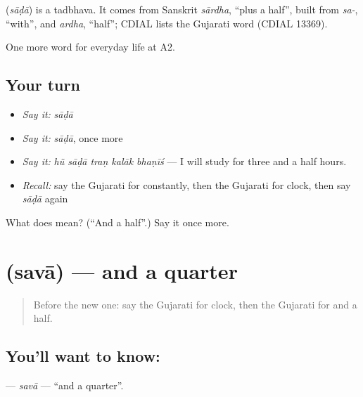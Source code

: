 \begin{cousinweb}
\textbf{} (\emph{sāḍā}) is a tadbhava. It comes from Sanskrit \emph{sārdha}, \textquotedblleft{}plus a half\textquotedblright{}, built from \emph{sa-}, \textquotedblleft{}with\textquotedblright{}, and \emph{ardha}, \textquotedblleft{}half\textquotedblright{}; CDIAL lists the Gujarati word (CDIAL 13369).
\end{cousinweb}

\begin{grammarlens}[title={What you've built}]
One more word for everyday life at A2.
\end{grammarlens}

\subsection*{Your turn}
\begin{itemize}
\raggedright
  \item \emph{Say it:} \emph{sāḍā}
  \item \emph{Say it:} \emph{sāḍā}, once more
  \item \emph{Say it:} \emph{hũ sāḍā traṇ kalāk bhaṇīś} — I will study for three and a half hours.
  \item \emph{Recall:} say the Gujarati for constantly, then the Gujarati for clock, then say \emph{sāḍā} again
\end{itemize}

\begin{tcolorbox}[breakable,colback=teal!4,colframe=teal!35!black,title={Before you move on}]
What does  mean? (\textquotedblleft{}And a half\textquotedblright{}.) Say it once more.
\end{tcolorbox}
\section[\texorpdfstring{\gu{સવા} (savā)}{સવા (savā)}]{ (savā) — and a quarter}

\label{lesson:GU-C176-sava}



\begin{quote}
Before the new one: say the Gujarati for clock, then the Gujarati for and a half.
\end{quote}

\subsection*{You'll want to know: }
\textbf{} — \emph{savā} — \textquotedblleft{}and a quarter\textquotedblright{}.

